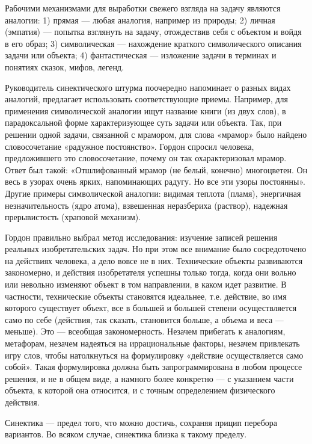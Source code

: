 Рабочими механизмами для выработки  свежего взгляда на задачу являются
аналогии:  1)  прямая  —  любая  аналогия,  например  из  природы;  2)
личная (эмпатия)  — попытка  взглянуть на  задачу, отождествив  себя с
объектом и войдя  в его образ; 3) символическая  — нахождение краткого
символического  описания  задачи  или  объекта;  4)  фантастическая  —
изложение задачи в терминах и понятиях сказок, мифов, легенд.

Руководитель  синектического  штурма  поочередно напоминает  о  разных
видах  аналогий,   предлагает  использовать   соответствующие  приемы.
Например, для  применения символической  аналогии ищут  название книги
(из двух слов), в парадоксальной форме характеризующее суть задачи или
объекта.  Так, при  решении одной  задачи, связанной  с мрамором,  для
слова  «мрамор» было  найдено  словосочетание «радужное  постоянство».
Гордон  спросил  человека,  предложившего это  словосочетание,  почему
он  так  охарактеризовал  мрамор.   Ответ  был  такой:  «Отшлифованный
мрамор  (не  белый,  конечно)  многоцветен. Он  весь  в  узорах  очень
ярких,  напоминающих  радугу.  Но  все эти  узоры  постоянны».  Другие
примеры  символической аналогии:  видимая теплота  (пламя), энергичная
незначительность  (ядро  атома),   взвешенная  неразбериха  (раствор),
надежная прерывистость (храповой механизм).

Гордон правильно  выбрал метод исследования: изучение  записей решения
реальных  изобретательских  задач.  Но  при  этом  все  внимание  было
сосредоточено  на  действиях   человека,  а  дело  вовсе   не  в  них.
Технические объекты  развиваются закономерно, и  действия изобретателя
успешны только тогда, когда они  вольно или невольно изменяют объект в
том  направлении,  в каком  идет  развитие.  В частности,  технические
объекты  становятся   идеальнее,  т.е.   действие,  во   имя  которого
существует объект, все в большей и большей степени осуществляется само
по  себе  (действия,  так  сказать,  становится  больше,  а  объема  и
веса —  меньше). Это  — всеобщая  закономерность. Незачем  прибегать к
аналогиям,  метафорам, незачем  надеяться  на иррациональные  факторы,
незачем  привлекать  игру  слов, чтобы  натолкнуться  на  формулировку
«действие осуществляется  само собой». Такая формулировка  должна быть
запрограммирована  в любом  процессе решения,  и  не в  общем виде,  а
намного более  конкретно —  с указанием части  объекта, к  которой она
относится, и с точным определением физического действия.

Синектика — предел  того, что можно достичь,  сохраняя прицип перебора
вариантов. Во всяком случае, синектика близка к такому пределу.






